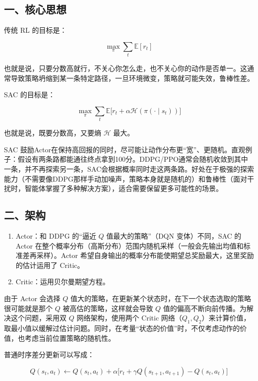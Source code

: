 \hypertarget{ux4e00ux6838ux5fc3ux601dux60f3-4}{%
\subsection{一、核心思想}\label{ux4e00ux6838ux5fc3ux601dux60f3-4}}

传统 RL 的目标是：

\[
\max_\pi
\sum_t
\mathbb{E}[r_t]
\]

也就是说，只要分数高就行，不关心你怎么走，也不关心你的动作是否单一。这通常导致策略坍缩到某一条特定路径，一旦环境微变，策略就可能失效，鲁棒性差。

SAC 的目标是：

\[
\max_\pi
\sum_t
\mathbb{E}
\bigl[
r_t+\alpha\mathcal{H}(\pi(\cdot\mid s_t))
\bigr]
\]

也就是说，既要分数高，又要熵 \(\mathcal{H}\) 最大。

SAC 鼓励Actor在保持高回报的同时，尽可能让动作分布更``宽''、更随机。直观例子：假设有两条路都能通往终点拿到100分。DDPG/PPO通常会随机收敛到其中一条，并不再探索另一条，SAC会根据概率同时走这两条路。好处在于极强的探索能力（不需要像DDPG那样手动加噪声，策略本身就是随机的）和鲁棒性（面对干扰时，智能体掌握了多种解决方案），适合需要保留更多可能性的场景。

\hypertarget{ux4e8cux67b6ux6784}{%
\subsection{二、架构}\label{ux4e8cux67b6ux6784}}

\begin{enumerate}
\def\labelenumi{\arabic{enumi}.}
\item
  Actor：和 DDPG 的``逼近 \(Q\) 值最大的策略''（DQN 变体）不同，SAC 的 Actor 在整个概率分布（高斯分布）范围内随机采样（一般会先输出均值和标准差再采样）。Actor 希望自身输出的概率分布能使期望总奖励最大，这里奖励的估计运用了 Critic。
\item
  Critic：运用贝尔曼期望方程。
\end{enumerate}

由于 Actor 会选择 \(Q\) 值大的策略，在更新某个状态时，在下一个状态选取的策略很可能就是那个 \(Q\) 被高估的策略，这样就会导致 \(Q\) 值的偏高不断向前传播。为解决这个问题，采用双 \(Q\) 网络架构，使用两个 Critic 网络（\(Q_1,Q_2\)）来计算价值，取最小值以缓解过估计问题。同时，在考量``状态的价值''时，不仅考虑动作的价值，也考虑当前位置策略的随机性。

普通时序差分更新可以写成：

\[
Q(s_t,a_t)
\leftarrow
Q(s_t,a_t)
+
\alpha
\bigl[
r_t+\gamma Q(s_{t+1},a_{t+1})-Q(s_t,a_t)
\bigr]
\]

